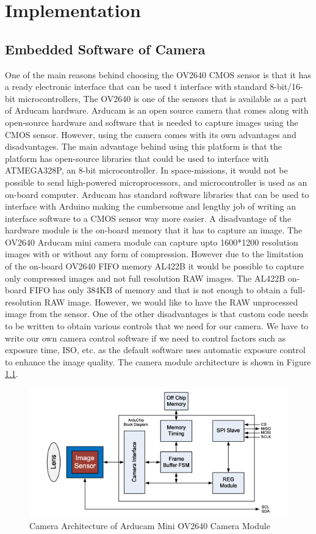 \chapter{Implementation}
\label{chp:Implementation}

\section{Embedded Software of Camera}
One of the main reasons behind choosing the OV2640 CMOS sensor is that it has a ready electronic interface that can be used t interface with standard 8-bit/16-bit microcontrollers,  The OV2640 is one of the sensors that is available as a part of Arducam hardware. Arducam is an open source camera that comes along with open-source hardware and software that is needed to capture images using the CMOS sensor. However, using the camera comes with its own advantages and disadvantages. The main advantage behind using this platform is that the platform has open-source libraries that could be used to interface with ATMEGA328P, an 8-bit microcontroller. In space-missions, it would not be possible to send high-powered microprocessors, and microcontroller is used as an on-board computer. Arducam has standard software libraries that can be used to interface with Arduino making the cumbersome and lengthy job of writing an interface software to a CMOS sensor way more easier.  A disadvantage of the hardware module is the on-board memory that it has to capture an image. The OV2640 Arducam mini camera module can capture upto 1600*1200 resolution images with or without any form of compression. However due to the limitation of the on-board OV2640 FIFO memory AL422B it would be possible to capture only compressed images and not full resolution RAW images. The AL422B on-board FIFO has only 384KB of memory and that is not enough to obtain a full-resolution RAW image. However, we would like to have the RAW unprocessed image from the sensor. One of the other disadvantages is that custom code needs to be written to obtain various controls that we need for our camera. We have to write our own camera control software if we need to control factors such as exposure time, ISO, etc. as the default software uses automatic exposure control to enhance the image quality. The camera module architecture is shown in Figure \ref{fig:arducam_arch}.

 \begin{figure}[!htbp]
\centering
\includegraphics[scale=0.75]{pics/arducam_architecture}
\caption{Camera Architecture of Arducam Mini OV2640 Camera Module}
\label{fig:arducam_arch}
\end{figure}

